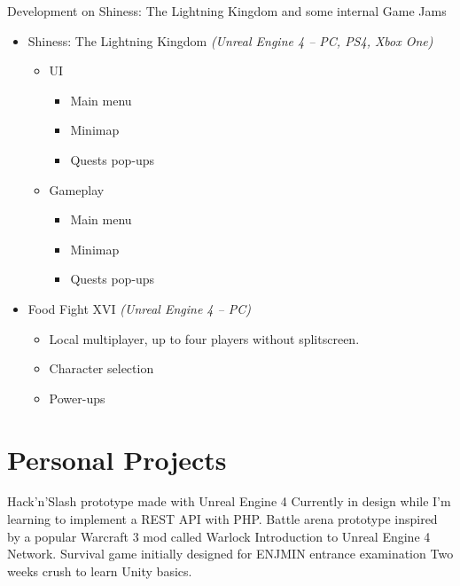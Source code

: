 \documentclass[10pt, a4paper, sans]{moderncv}
\begin{document}
            {Development on Shiness: The Lightning Kingdom and some internal Game Jams}
{
\begin{itemize}
\item Shiness: The Lightning Kingdom \emph{(Unreal Engine 4 -- PC, PS4, Xbox One)}
  \begin{itemize}
    \item UI
    \begin{itemize}
      \item Main menu
      \item Minimap
      \item Quests pop-ups
    \end{itemize}
    \item Gameplay
    \begin{itemize}
      \item Main menu
      \item Minimap
      \item Quests pop-ups
    \end{itemize}
  \end{itemize}
\item Food Fight XVI \emph{(Unreal Engine 4 -- PC)}
  \begin{itemize}
    \item Local multiplayer, up to four players without splitscreen.
    \item Character selection
    \item Power-ups
  \end{itemize}
\end{itemize}}

\section{Personal Projects}

            {Hack'n'Slash prototype made with Unreal Engine 4}
            {Currently in design while I'm learning to implement a REST API with PHP.}
            {Battle arena prototype inspired by a popular Warcraft 3 mod called Warlock}
            {Introduction to Unreal Engine 4 Network.}
            {Survival game initially designed for ENJMIN entrance examination}
            {Two weeks crush to learn Unity basics.}
\end{document}

